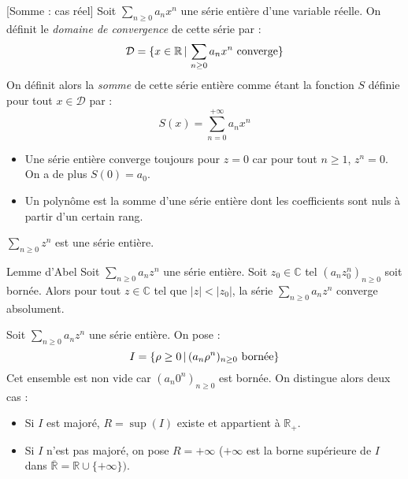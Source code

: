 \documentclass[french,11pt,twoside]{VcCours}
\begin{document}
  \begin{Definition}{}[Somme : cas réel] Soit $\sum_{n \geq 0} a_n x^n$ une série entière d'une variable réelle. On définit le \emph{domaine de convergence} de cette série par :
 $$ \mathcal{D} = \lbrace x \in \mathbb{R} \, \vert \,  \sum_{n \geq 0} a_n x^n \hbox{ converge} \rbrace$$
 On définit alors la \emph{somme} de cette série entière comme étant la fonction $S$ définie pour tout $x \in \mathcal{D}$ par :
 $$ S(x) = \sum_{n=0}^{+ \infty} a_n x^n$$
 \end{Definition}
 
 \begin{Remarques}{}
\begin{itemize} 
 \item Une série entière converge toujours pour $z=0$ car pour tout $n \geq 1$, $z^n=0$. On a de plus $S(0)=a_0$.
 \item Un polynôme est la somme d'une série entière dont les coefficients sont nuls à partir d'un certain rang.
 \end{itemize}
\end{Remarques}

\begin{Exemple}{} $\sum_{n \geq 0} z^n$ est une série entière. 

\end{Exemple}

\newpage

\begin{Theoreme}{Lemme d'Abel}
Soit $\sum_{n \geq 0} a_n z^n$ une série entière. 
Soit $z_0 \in \mathbb{C}$ tel $(a_n z_0^n)_{n \geq 0}$ soit bornée. 
Alors pour tout $z \in \mathbb{C}$ tel que $\vert z \vert < \vert z_0 \vert$, la série $\sum_{n \geq 0} a_n z^n$ converge absolument.
\end{Theoreme}

\begin{Demonstration}{}

\vspace{6cm}
\end{Demonstration}

Soit $\sum_{n \geq 0} a_n z^n$ une série entière. On pose :
$$ I = \lbrace \rho \geq 0 \, \vert \, (a_n \rho^n)_{n \geq 0} \hbox{ bornée}\rbrace $$
Cet ensemble est non vide car $(a_n 0^n)_{n \geq 0}$ est bornée. On distingue alors deux cas :
\begin{itemize}
\item Si $I$ est majoré, $R = \sup(I)$ existe et appartient à $\mathbb{R}_+$.
\item Si $I$ n'est pas majoré, on pose $R= + \infty$ ($+ \infty$ est la borne supérieure de $I$ dans $\overline{\mathbb{R}} = \mathbb{R} \cup \lbrace + \infty \rbrace)$.
\end{itemize}
\end{document}
